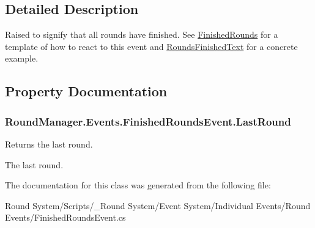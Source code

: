\subsection{Detailed Description}
Raised to signify that all rounds have finished. See \hyperlink{class_round_manager_1_1_finished_rounds}{Finished\+Rounds} for a template of how to react to this event and \hyperlink{class_round_manager_1_1_rounds_finished_text}{Rounds\+Finished\+Text} for a concrete example. 



\subsection{Property Documentation}
\hypertarget{class_round_manager_1_1_events_1_1_finished_rounds_event_ad2db13aeab97e348d2c4b3a3c152cd32}{}
\subsubsection[{Last\+Round}]{ Round\+Manager.\+Events.\+Finished\+Rounds\+Event.\+Last\+Round\hspace{0.3cm}{\ttfamily [get]}}\label{class_round_manager_1_1_events_1_1_finished_rounds_event_ad2db13aeab97e348d2c4b3a3c152cd32}


Returns the last round. 

The last round.

The documentation for this class was generated from the following file\+:\begin{DoxyCompactItemize}
\item 
Round System/\+Scripts/\+\_\+\+Round System/\+Event System/\+Individual Events/\+Round Events/Finished\+Rounds\+Event.\+cs\end{DoxyCompactItemize}
